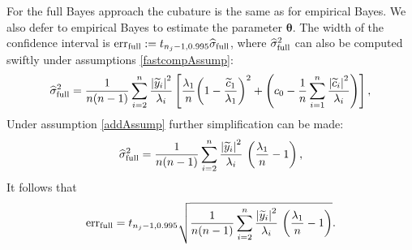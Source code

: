 \documentclass{iitthesis}          %
\newcommand{\bm}[1]{\boldsymbol{#1}}
\newcommand{\vtheta}{{\bm{\theta}}}
\newcommand{\vy}{\bm{y}}
\newcommand{\tvy}{\tilde{\bm{y}}}
\newcommand{\hsigma}{\widehat{\sigma}}
\newcommand{\MLE}{\textup{EB}}
\newcommand{\err}{\textup{err}}
\def\abs#1{\ensuremath{\left \lvert #1 \right \rvert}}
\begin{document}

For the full Bayes approach the cubature is the same as for empirical Bayes.  We also defer to empirical Bayes to estimate the parameter $\vtheta$.  The width of the confidence interval is $\err_{\textup{full}} 
:= t_{n_j-1,0.995} \hsigma_{\textup{full}}$, where $\hsigma_{\textup{full}}^2$ can also be computed swiftly under assumptions \eqref{fastcompAssump}:
\begin{align*} %
\widehat{\sigma}^2_{\textup{full}} =
\frac{1}{n(n-1)} \sum_{i=2}^n \frac{\abs{\widetilde{y}_i}^2}{\lambda_i}
\left[\frac{\lambda_1}{n}{\left(1 - \frac{\widetilde{c}_1}{\lambda_1}\right)^2} + \left(c_0  - \frac 1n \sum_{i=1}^n \frac{\abs{\widetilde{c}_i}^2}{\lambda_i}\right) \right],
\end{align*}
Under assumption \eqref{addAssump} further simplification can be made:
\begin{equation*} %
\widehat{\sigma}^2_{\textup{full}}
=
\frac{1}{n(n-1)} \sum_{i=2}^n \frac{\abs{\widetilde{y}_i}^2}{\lambda_i} \, \left(\frac{\lambda_1}{n}  - 1  \right),
\end{equation*}
It follows that
\begin{equation*} %
\err_{\textup{full}}
=
t_{n_j-1,0.995}
\sqrt{\frac{1}{n(n-1)} \sum_{i=2}^n \frac{\abs{\widetilde{y}_i}^2}{\lambda_i} \, \left(\frac{\lambda_1}{n}  - 1  \right)}.
\end{equation*}


\end{document}
